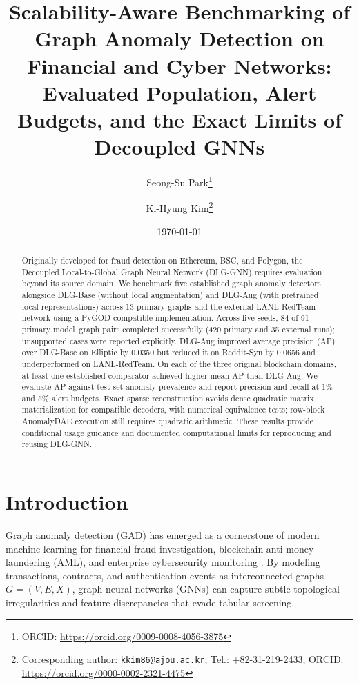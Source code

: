 \documentclass[11pt,a4paper]{article}
\title{\textbf{\Large Scalability-Aware Benchmarking of Graph Anomaly Detection on Financial and Cyber Networks: Evaluated Population, Alert Budgets, and the Exact Limits of Decoupled GNNs}}
\author[1]{Seong-Su Park\thanks{ORCID: \url{https://orcid.org/0009-0008-4056-3875}}}
\author[2]{Ki-Hyung Kim\thanks{Corresponding author: \texttt{kkim86@ajou.ac.kr}; Tel.: +82-31-219-2433; ORCID: \url{https://orcid.org/0000-0002-2321-4475}}}
\affil[1]{\small Department of Computer Engineering, Ajou University, Suwon 16499, Republic of Korea; \texttt{parky@ajou.ac.kr}}
\affil[2]{\small Department of Cyber Security, Ajou University, Suwon 16499, Republic of Korea; \texttt{kkim86@ajou.ac.kr}}
\date{\today}
\begin{document}
\maketitle

\begin{abstract}
Originally developed for fraud detection on Ethereum, BSC, and Polygon, the Decoupled Local-to-Global Graph Neural Network (DLG-GNN) requires evaluation beyond its source domain. We benchmark five established graph anomaly detectors alongside DLG-Base (without local augmentation) and DLG-Aug (with pretrained local representations) across 13 primary graphs and the external LANL-RedTeam network using a PyGOD-compatible implementation. Across five seeds, 84 of 91 primary model--graph pairs completed successfully (420 primary and 35 external runs); unsupported cases were reported explicitly. DLG-Aug improved average precision (AP) over DLG-Base on Elliptic by 0.0350 but reduced it on Reddit-Syn by 0.0656 and underperformed on LANL-RedTeam. On each of the three original blockchain domains, at least one established comparator achieved higher mean AP than DLG-Aug. We evaluate AP against test-set anomaly prevalence and report precision and recall at 1\% and 5\% alert budgets. Exact sparse reconstruction avoids dense quadratic matrix materialization for compatible decoders, with numerical equivalence tests; row-block AnomalyDAE execution still requires quadratic arithmetic. These results provide conditional usage guidance and documented computational limits for reproducing and reusing DLG-GNN.
\end{abstract}

\par

\section{Introduction}
\label{sec:introduction}
Graph anomaly detection (GAD) has emerged as a cornerstone of modern machine learning for financial fraud investigation, blockchain anti-money laundering (AML), and enterprise cybersecurity monitoring \cite{ma2023survey,qiao2025survey,dilini2026comprehensive}. By modeling transactions, contracts, and authentication events as interconnected graphs $G=(V, E, X)$, graph neural networks (GNNs) can capture subtle topological irregularities and feature discrepancies that evade tabular screening.
\end{document}
